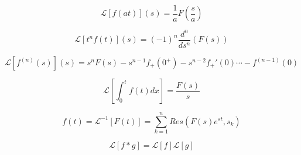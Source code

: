 \documentclass[10pt,a4paper]{article}
\begin{document}
\begin{equation}
\mathcal{L}[f(at)](s) = \dfrac{1}{a}F\left( \dfrac{s}{a}\right)
\end{equation}

\begin{equation}
\mathcal{L}[t^{n}f(t)](s) = (-1)^{n}\dfrac{d^{n}}{ds^{n}}(F(s))
\end{equation}

\begin{equation}
\mathcal{L}[f^{(n)}(s)](s) = s^{n}F(s) - s^{n-1}f_{+}(0^{+}) - s^{n-2}f_{+}'(0) \dotsm - f^{(n-1)}(0)
\end{equation}

\begin{equation}
\mathcal{L}\left[\int_0^t f(t) dx\right] = \dfrac{F(s)}{s}
\end{equation}

\begin{equation}
f(t) = \mathcal{L}^{-1}[F(t)] = \sum_{k = 1}^{n} Res(F(s)e^{st}, s_{k})
\end{equation}

\begin{equation}
\mathcal{L}[f * g] = \mathcal{L}[f]\mathcal{L}[g]
\end{equation}
\end{document}
